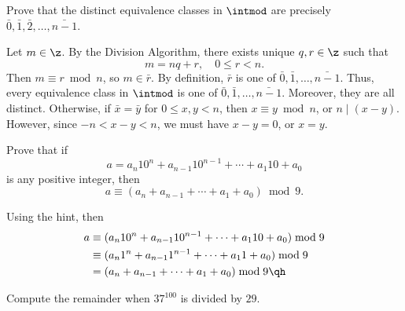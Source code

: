 \begin{exercise}\label{ex0.3.2}
    Prove that the distinct equivalence classes in $\intmod$ are precisely $\bar 0, \bar 1, \bar 2, \ldots, \bar{n - 1}$.

\end{exercise}

\begin{sol}
    Let $m \in \z$. By the Division Algorithm, there exists unique $q, r \in \z$ such that
    \[m = nq + r, \quad 0 \leq r < n.\]
    Then $m \equiv r \bmod n$, so $m \in \bar r$. By definition, $\bar r$ is one of $\bar 0, \bar 1, \ldots, \bar{n - 1}$. Thus, every equivalence class in $\intmod$ is one of $\bar 0, \bar 1, \ldots, \bar{n - 1}$. Moreover, they are all distinct. Otherwise, if $\bar x = \bar y$ for $0 \leq x, y < n$, then $x \equiv y \bmod n$, or $n \mid (x - y)$. However, since $-n < x - y < n$, we must have $x - y = 0$, or $x = y$.
\end{sol}

\begin{exercise}\label{ex0.3.3}
    Prove that if
    \[a = a_n 10^n + a_{n - 1}10^{n - 1} + \cdots + a_1 10 + a_0\]
    is any positive integer, then
    \[a \equiv (a_n + a_{n - 1} + \cdots + a_1 + a_0) \bmod 9.\]


\end{exercise}

\begin{sol} 
    Using the hint, then
    \begin{align*}
        a & \equiv (a_n10^n + a_{n - 1}10^{n - 1} + \cdots + a_110 + a_0) \bmod 9 \\
        & \equiv (a_n1^n + a_{n - 1}1^{n - 1} + \cdots + a_11 + a_0) \bmod 9 \\
        & = (a_n + a_{n - 1} + \cdots + a_1 + a_0) \bmod 9 \qh
    \end{align*}
\end{sol}

\begin{exercise}\label{ex0.3.4}
    Compute the remainder when $37^{100}$ is divided by $29$.
\end{exercise}

